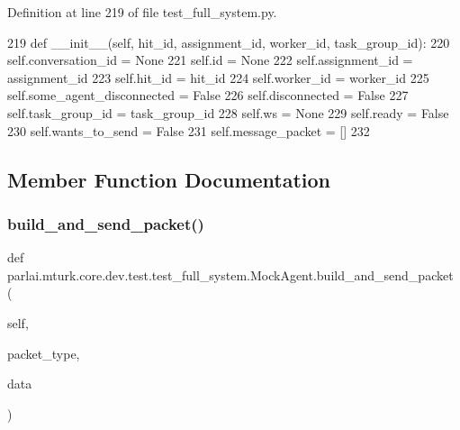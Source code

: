 Definition at line 219 of file test\+\_\+full\+\_\+system.\+py.


\begin{DoxyCode}
219     \textcolor{keyword}{def }\_\_init\_\_(self, hit\_id, assignment\_id, worker\_id, task\_group\_id):
220         self.conversation\_id = \textcolor{keywordtype}{None}
221         self.id = \textcolor{keywordtype}{None}
222         self.assignment\_id = assignment\_id
223         self.hit\_id = hit\_id
224         self.worker\_id = worker\_id
225         self.some\_agent\_disconnected = \textcolor{keyword}{False}
226         self.disconnected = \textcolor{keyword}{False}
227         self.task\_group\_id = task\_group\_id
228         self.ws = \textcolor{keywordtype}{None}
229         self.ready = \textcolor{keyword}{False}
230         self.wants\_to\_send = \textcolor{keyword}{False}
231         self.message\_packet = []
232 
\end{DoxyCode}


\subsection{Member Function Documentation}
\mbox{\label{classparlai_1_1mturk_1_1core_1_1dev_1_1test_1_1test__full__system_1_1MockAgent_a62cda90db92b3c458a48661f3a37be28}} 
\subsubsection{\texorpdfstring{build\+\_\+and\+\_\+send\+\_\+packet()}{build\_and\_send\_packet()}}
{\footnotesize\ttfamily def parlai.\+mturk.\+core.\+dev.\+test.\+test\+\_\+full\+\_\+system.\+Mock\+Agent.\+build\+\_\+and\+\_\+send\+\_\+packet (\begin{DoxyParamCaption}\item[{}]{self,  }\item[{}]{packet\+\_\+type,  }\item[{}]{data }\end{DoxyParamCaption})}



